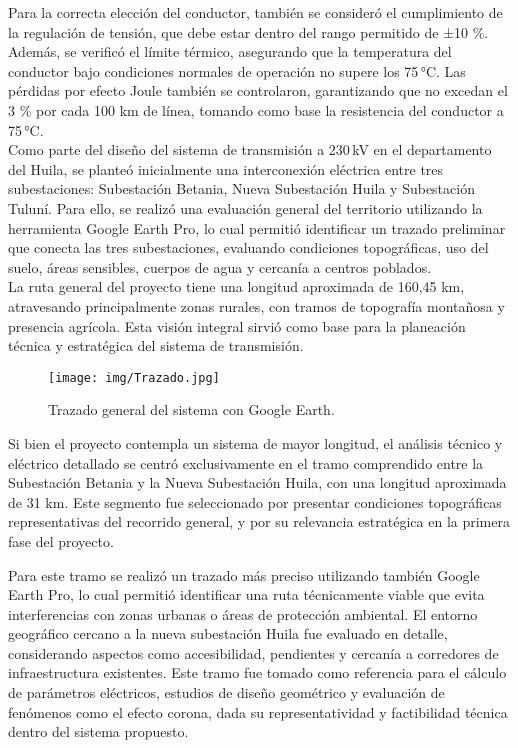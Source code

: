 Para la correcta elección del conductor, también se consideró el cumplimiento de la regulación de tensión, que debe estar dentro del rango permitido de ±10 \%. Además, se verificó el límite térmico, asegurando que la temperatura del conductor bajo condiciones normales de operación no supere los 75 °C. Las pérdidas por efecto Joule también se controlaron, garantizando que no excedan el 3 \% por cada 100 km de línea, tomando como base la resistencia del conductor a 75 °C.\\
Como parte del diseño del sistema de transmisión a 230 kV en el departamento del Huila, se planteó inicialmente una interconexión eléctrica entre tres subestaciones: Subestación Betania, Nueva Subestación Huila y Subestación Tuluní. Para ello, se realizó una evaluación general del territorio utilizando la herramienta Google Earth Pro, lo cual permitió identificar un trazado preliminar que conecta las tres subestaciones, evaluando condiciones topográficas, uso del suelo, áreas sensibles, cuerpos de agua y cercanía a centros poblados.\\
La ruta general del proyecto tiene una longitud aproximada de 160,45 km, atravesando principalmente zonas rurales, con tramos de topografía montañosa y presencia agrícola. Esta visión integral sirvió como base para la planeación técnica y estratégica del sistema de transmisión.\\

\begin{figure}[!ht]
\centering
\texttt{[image: img/Trazado.jpg]}
\caption{Trazado general del sistema con Google Earth.}
\label{fig:general}
\end{figure}
Si bien el proyecto contempla un sistema de mayor longitud, el análisis técnico y eléctrico detallado se centró exclusivamente en el tramo comprendido entre la Subestación Betania y la Nueva Subestación Huila, con una longitud aproximada de 31 km. Este segmento fue seleccionado por presentar condiciones topográficas representativas del recorrido general, y por su relevancia estratégica en la primera fase del proyecto.

Para este tramo se realizó un trazado más preciso utilizando también Google Earth Pro, lo cual permitió identificar una ruta técnicamente viable que evita interferencias con zonas urbanas o áreas de protección ambiental. El entorno geográfico cercano a la nueva subestación Huila fue evaluado en detalle, considerando aspectos como accesibilidad, pendientes y cercanía a corredores de infraestructura existentes. Este tramo fue tomado como referencia para el cálculo de parámetros eléctricos, estudios de diseño geométrico y evaluación de fenómenos como el efecto corona, dada su representatividad y factibilidad técnica dentro del sistema propuesto.


